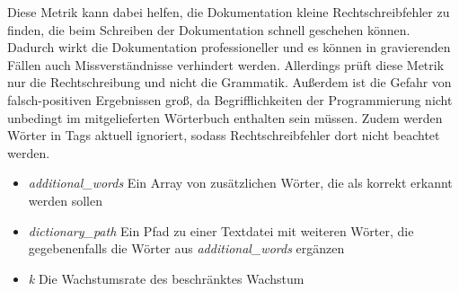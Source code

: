 Diese Metrik kann dabei helfen, die Dokumentation kleine Rechtschreibfehler zu finden, die beim Schreiben der Dokumentation schnell geschehen können. Dadurch wirkt die Dokumentation professioneller und es können in gravierenden Fällen auch Missverständnisse verhindert werden. Allerdings prüft diese Metrik nur die Rechtschreibung und nicht die Grammatik. Außerdem ist die Gefahr von falsch-positiven Ergebnissen groß, da Begrifflichkeiten der Programmierung nicht unbedingt im mitgelieferten Wörterbuch enthalten sein müssen. Zudem werden Wörter in Tags aktuell ignoriert, sodass Rechtschreibfehler dort nicht beachtet werden. 
 \begin{itemize}
    \item \textit{additional\_words} Ein Array von zusätzlichen Wörter, die als korrekt erkannt werden sollen
     \item
    \textit{dictionary\_path} Ein Pfad zu einer Textdatei mit weiteren Wörter, die gegebenenfalls die Wörter aus \textit{additional\_words} ergänzen
    \item \textit{k} Die Wachstumsrate des beschränktes Wachstum
   
  
 \end{itemize}  
 

 